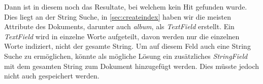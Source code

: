Dann ist in diesem noch das Resultate, bei welchem kein Hit
gefunden wurde. Dies liegt an der String Suche, in
\cref{sec:createindex} haben wir die meisten Attribute des
Dokuments, darunter auch \emph{album}, als \emph{TextField} 
erstellt. Ein \emph{TextField} wird in einzelne Worte aufgeteilt,
davon werden nur die einzelnen Worte indiziert, nicht der
gesamte String. Um auf diesem Feld auch eine String
Suche zu ermöglichen, könnte als mögliche Lösung ein
zusätzliches \emph{StringField} mit dem gesamten String zum Dokument
hinzugefügt werden. Dies müsste jedoch nicht auch gespeichert werden.
